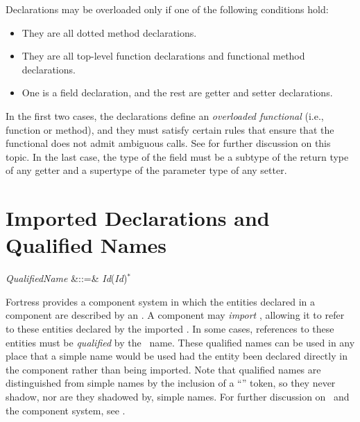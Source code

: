 Declarations may be overloaded only if one of the following conditions hold:
\begin{itemize}

\item
They are all dotted method declarations.

\item
They are all top-level function declarations and functional method declarations.

\item
One is a field declaration, 
and the rest are getter and setter declarations.

\end{itemize}
In the first two cases,
the declarations define an \emph{overloaded functional} 
(i.e., function or method), 
and they must satisfy certain rules 
that ensure that the functional does not admit ambiguous calls.
See  for further discussion on this topic.
In the last case, 
the type of the field must be a subtype of the return type of any getter 
and a supertype of the parameter type of any setter.

\section{Imported Declarations and Qualified Names}
\begin{Grammar}
\emph{QualifiedName} &::=& \emph{Id}(\emph{Id})$^*$\\
\end{Grammar}

Fortress provides a component system
in which the entities declared in a component
are described by an \apiN.
A component may \emph{import} \apisN,
allowing it to refer to these entities
declared by the imported \apisN.
In some cases,
references to these entities must be \emph{qualified}
by the \apiN\ name.
These qualified names can be used
in any place that a simple name would be used
had the entity been declared directly in the component
rather than being imported.
Note that qualified names are distinguished from simple names
by the inclusion of a ``'' token,
so they never shadow, nor are they shadowed by, simple names.
For further discussion on \apisN\ and the component system,
see .
